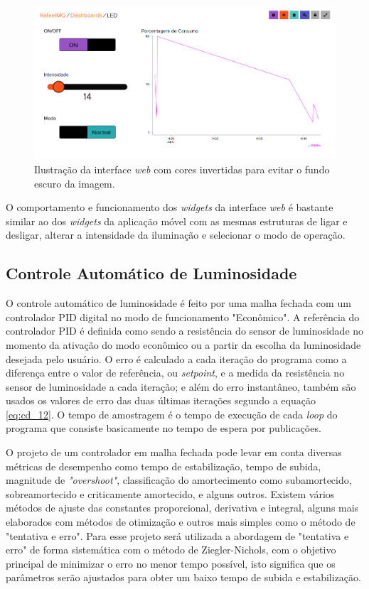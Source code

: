 \begin{figure}[ht]
    \begin{center}
    \includegraphics[width=\textwidth]{figuras/adaio.PNG}
    \end{center}
    \caption[Ilustração da interface \textit{web}.]{Ilustração da interface \textit{web} com cores invertidas para evitar o fundo escuro da imagem.}
    \label{adaio}
\end{figure}

O comportamento e funcionamento dos \textit{widgets} da interface \textit{web} é bastante similar ao dos \textit{widgets} da aplicação móvel com as mesmas estruturas de ligar e desligar, alterar a intensidade da iluminação e selecionar o modo de operação.

\subsection{Controle Automático de Luminosidade}

O controle automático de luminosidade é feito por uma malha fechada com um controlador PID digital no modo de funcionamento "Econômico". A referência do controlador \acf{PID} é definida como sendo a resistência do sensor de luminosidade no momento da ativação do modo econômico ou a partir da escolha da luminosidade desejada pelo usuário. O erro é calculado a cada iteração do programa como a diferença entre o valor de referência, ou \textit{setpoint}, e a  medida da resistência no sensor de luminosidade a cada iteração; e além do erro instantâneo, também são usados os valores de erro das duas últimas iterações segundo a equação \ref{eq:cd_12}. O tempo de amostragem é o tempo de execução de cada \textit{loop} do programa que consiste basicamente no tempo de espera por publicações.

O projeto de um controlador em malha fechada pode levar em conta diversas métricas de desempenho como tempo de estabilização, tempo de subida, magnitude de \textit{"overshoot"}, classificação do amortecimento como subamortecido, sobreamortecido e criticamente amortecido, e alguns outros. Existem vários métodos de ajuste das constantes proporcional, derivativa e integral, alguns mais elaborados com métodos de otimização e outros mais simples como o método de "tentativa e erro". Para esse projeto será utilizada a abordagem de "tentativa e erro" de forma sistemática com o método de Ziegler-Nichols, com o objetivo principal de minimizar o erro no menor tempo possível, isto significa que os parâmetros serão ajustados para obter um baixo tempo de subida e estabilização.

